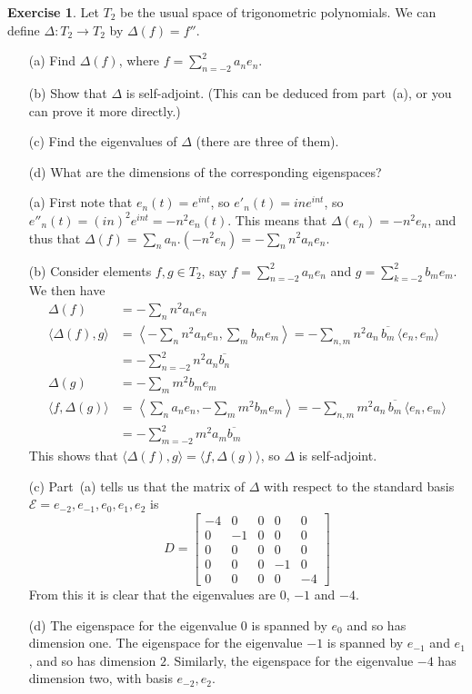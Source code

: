 \documentclass{amsart}
\newcommand{\bsm}       {\left[\begin{smallmatrix}}
\newcommand{\esm}       {\end{smallmatrix}\right]}
\newcommand{\Dl}        {\Delta}
\newcommand{\ip}[1]     {\langle #1\rangle}
\newcommand{\CE}        {{\mathcal{E}}}
\renewcommand{\:}       {\colon}
\theoremstyle{definition}
\newtheorem{exercise}{Exercise}[section]
\renewenvironment{solution}{\SolutionAtEnd}{\endSolutionAtEnd}
\begin{document}
\begin{exercise}\label{ex-diff-spectrum}
 Let $T_2$ be the usual space of trigonometric polynomials.  We can
 define $\Dl\:T_2\to T_2$ by $\Dl(f)=f''$.
 \begin{itemize}
  \item[(a)] Find $\Dl(f)$, where $f=\sum_{n=-2}^2 a_ne_n$.
  \item[(b)] Show that $\Dl$ is self-adjoint. (This can be deduced
   from part~(a), or you can prove it more directly.)
  \item[(c)] Find the eigenvalues of $\Dl$ (there are three of them).
  \item[(d)] What are the dimensions of the corresponding eigenspaces? 
 \end{itemize}
\end{exercise}
\begin{solution}
 \begin{itemize}
  \item[(a)]
   First note that $e_n(t)=e^{int}$, so $e'_n(t)=ine^{int}$, so
   $e''_n(t)=(in)^2e^{int}=-n^2e_n(t)$.  This means that
   $\Dl(e_n)=-n^2e_n$, and thus that
   $\Dl(f)=\sum_n a_n.(-n^2e_n)=-\sum_n n^2 a_n e_n$.
  \item[(b)]
   Consider elements $f,g\in T_2$, say $f=\sum_{n=-2}^2a_ne_n$ and
   $g=\sum_{k=-2}^2b_me_m$.  We then have 
   \begin{align*}
    \Dl(f) &= -\sum_n n^2 a_n e_n \\   
    \ip{\Dl(f),g} &=
     \left\langle -\sum_n n^2a_ne_n,\sum_m b_me_m\right\rangle 
      = -\sum_{n,m} n^2 a_n\,\overline{b_m}\,\ip{e_n,e_m} \\
    &= -\sum_{n=-2}^2 n^2 a_n \overline{b_n} \\  
    \Dl(g) &= -\sum_m m^2 b_m e_m \\
    \ip{f,\Dl(g)} &=
     \left\langle\sum_n a_ne_n,-\sum_m m^2b_me_m\right\rangle 
      = -\sum_{n,m} m^2 a_n\,\overline{b_m}\,\ip{e_n,e_m} \\
    &= -\sum_{m=-2}^2 m^2 a_m \overline{b_m}
   \end{align*}
   This shows that $\ip{\Dl(f),g}=\ip{f,\Dl(g)}$, so $\Dl$ is
   self-adjoint.
  \item[(c)] Part~(a) tells us that the matrix of $\Dl$ with respect
   to the standard basis $\CE=e_{-2},e_{-1},e_0,e_1,e_2$ is
   {\tiny \[
     D = \bsm -4 &  0 & 0 &  0 &  0 \\
               0 & -1 & 0 &  0 &  0 \\
               0 &  0 & 0 &  0 &  0 \\
               0 &  0 & 0 & -1 &  0 \\
               0 &  0 & 0 &  0 & -4 \esm 
   \]}
   From this it is clear that the eigenvalues are $0$, $-1$ and $-4$.
  \item[(d)] The eigenspace for the eigenvalue $0$ is spanned by $e_0$
   and so has dimension one.  The eigenspace for the eigenvalue $-1$ is
   spanned by $e_{-1}$ and $e_1$, and so has dimension $2$.
   Similarly, the eigenspace for the eigenvalue $-4$ has dimension two,
   with basis $e_{-2},e_2$. 
 \end{itemize}
\end{solution}
\end{document}
